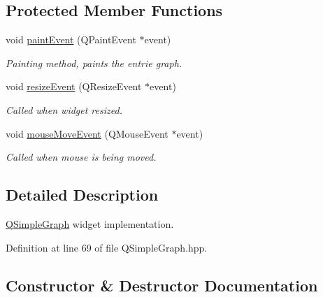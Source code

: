 \subsection*{Protected Member Functions}
\begin{DoxyCompactItemize}
\item 
void \hyperlink{class_fossa_1_1_q_simple_graph_1_1_q_simple_graph_a6559739099820e1303c1dbe2c5757bc4}{paint\+Event} (Q\+Paint\+Event $\ast$event)
\begin{DoxyCompactList}\small\item\em Painting method, paints the entrie graph. \end{DoxyCompactList}\item 
void \hyperlink{class_fossa_1_1_q_simple_graph_1_1_q_simple_graph_a4399efbb6a02fafa1e0198463d302e29}{resize\+Event} (Q\+Resize\+Event $\ast$event)
\begin{DoxyCompactList}\small\item\em Called when widget resized. \end{DoxyCompactList}\item 
void \hyperlink{class_fossa_1_1_q_simple_graph_1_1_q_simple_graph_a7ae9773902324fc533f0b18294f7c516}{mouse\+Move\+Event} (Q\+Mouse\+Event $\ast$event)
\begin{DoxyCompactList}\small\item\em Called when mouse is being moved. \end{DoxyCompactList}\end{DoxyCompactItemize}


\subsection{Detailed Description}
\hyperlink{class_fossa_1_1_q_simple_graph_1_1_q_simple_graph}{Q\+Simple\+Graph} widget implementation. 

Definition at line 69 of file Q\+Simple\+Graph.\+hpp.



\subsection{Constructor \& Destructor Documentation}
\mbox{\label{class_fossa_1_1_q_simple_graph_1_1_q_simple_graph_ab08b1293b3698e1e179a8d36dc737c77}} 
